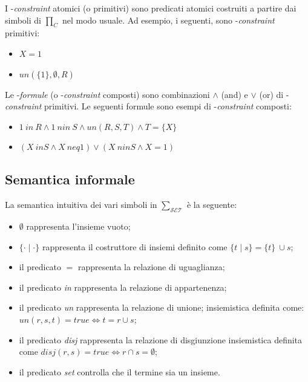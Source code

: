 \documentclass[12pt,a4paper,openright]{book} %
\begin{document}
I \calset{}-\textit{constraint} atomici (o primitivi) sono predicati atomici costruiti a partire dai simboli di $\prod_C$ nel modo usuale. Ad esempio, i seguenti, sono \calset{}-\textit{constraint} primitivi:
\begin{itemize}
	\item $X = 1$
	\item $un(\{1\}, \emptyset, R)$
\end{itemize}

Le \calset{}-\textit{formule} (o \calset{}-\textit{constraint} composti) sono combinazioni $\wedge$ (and) e $\vee$ (or) di \calset{}-\textit{constraint} primitivi. Le seguenti formule sono esempi di \calset{}-\textit{constraint} composti:
\begin{itemize}
	\item $1\ in\ R \land 1\ nin\ S \land un(R,S,T) \land T = \{X\}$
	\item $(X\ in S \land X\ neq 1) \lor (X\ nin S \land X = 1)$
\end{itemize}

\subsection{Semantica informale}
\label{subsec:clpbasedlang_lset_semantics}

La semantica intuitiva dei vari simboli in $\sum_{\mathcal{SET}}$ è la seguente:

\begin{itemize}
	\item $\emptyset$ rappresenta l’insieme vuoto;
	\item $\{\cdot\mid\cdot\}$ rappresenta il costruttore di insiemi definito come $\{t\mid s\} = \{t\}\ \cup s$;
	\item il predicato $=$ rappresenta la relazione di uguaglianza;
	\item il predicato \textit{in} rappresenta la relazione di appartenenza;
	\item il predicato \textit{un} rappresenta la relazione di unione; insiemistica definita come:
	$un(r,s,t) = true \Longleftrightarrow t = r \cup s$;
	\item il predicato \textit{disj} rappresenta la relazione di disgiunzione insiemistica definita come
	$disj(r,s) = true \Longleftrightarrow r \cap s = \emptyset$;
	\item il predicato \textit{set} controlla che il termine sia un insieme.
\end{itemize}
\end{document}
